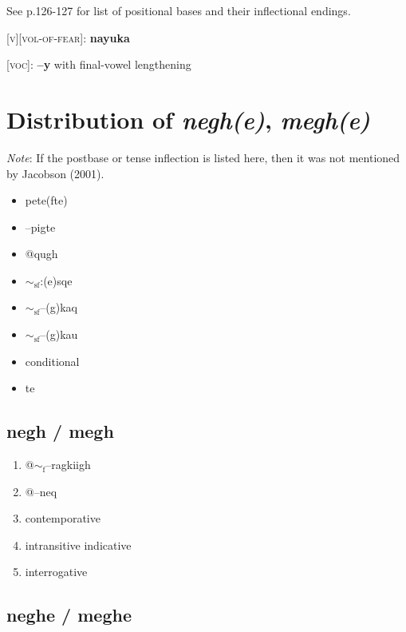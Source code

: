 \documentclass{article}
\begin{document}
\bigskip

See p.126-127 for list of positional bases and their inflectional endings.

\bigskip

\textsc{[v][vol-of-fear]}: \textbf{nayuka}

\bigskip

\textsc{[voc]}: \textbf{--y} with final-vowel lengthening


\section{Distribution of \textit{negh(e)}, \textit{megh(e)}}

\textit{Note}: If the postbase or tense inflection is listed here, then it was not mentioned by Jacobson (2001).

\begin{itemize}
\renewcommand\labelitemi{$\cdot$}
\item pete(fte)
\item --pigte
\item @qugh
\item $\sim_\text{sf}$:(e)sqe
\item $\sim_\text{sf}$--(g)kaq
\item $\sim_\text{sf}$--(g)kau
\item conditional
\item te
\end{itemize}


\subsection{negh / megh}

\begin{enumerate}
\item @$\sim_\text{f}$--ragkiigh
\item @--neq
\item contemporative
\item intransitive indicative
\item interrogative
\end{enumerate}


\subsection{neghe / meghe}
\end{document}
